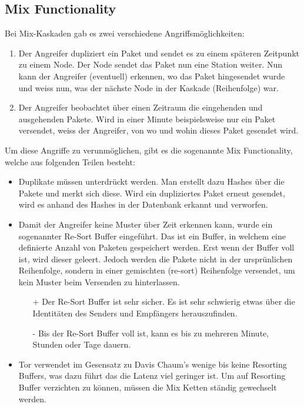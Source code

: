 \subsection{Mix Functionality}\label{sec:mix-functionality}
Bei Mix-Kaskaden gab es zwei verschiedene Angriffsmöglichkeiten:
\begin{enumerate}
    \item Der Angreifer dupliziert ein Paket und sendet es zu einem späteren Zeitpunkt zu einem Node. Der Node sendet das Paket nun eine Station weiter. Nun kann der Angreifer (eventuell) erkennen, wo das Paket hingesendet wurde und weiss nun, was der nächste Node in der Kaskade (Reihenfolge) war.
    \item Der Angreifer beobachtet über einen Zeitraum die eingehenden und ausgehenden Pakete. Wird in einer Minute beispielsweise nur ein Paket versendet, weiss der Angreifer, von wo und wohin dieses Paket gesendet wird.
\end{enumerate}
Um diese Angriffe zu verunmöglichen, gibt es die sogenannte Mix Functionality, welche aus folgenden Teilen besteht:
\begin{itemize}	
	\item Duplikate müssen unterdrückt werden. Man erstellt dazu Hashes über die Pakete und merkt sich diese. Wird ein dupliziertes Paket erneut gesendet, wird es anhand des Hashes in der Datenbank erkannt und verworfen.
	\item Damit der Angreifer keine Muster über Zeit erkennen kann, wurde ein sogenannter Re-Sort Buffer eingeführt. Das ist ein Buffer, in welchem eine definierte Anzahl von Paketen gespeichert werden. Erst wenn der Buffer voll ist, wird dieser geleert. Jedoch werden die Pakete nicht in der ursprünlichen Reihenfolge, sondern in einer gemischten (re-sort) Reihenfolge versendet, um kein Muster beim Versenden zu hinterlassen.
	\begin{itemize}
	    \item[+] Der Re-Sort Buffer ist sehr sicher. Es ist sehr schwierig etwas über die Identitäten des Senders und Empfängers herauszufinden.
	    \item[-] Bis der Re-Sort Buffer voll ist, kann es bis zu mehreren Minute, Stunden oder Tage dauern.
	\end{itemize}
	\item Tor verwendet im Gesensatz zu Davis Chaum's wenige bis keine Resorting Buffers, was dazu führt das die Latenz viel geringer ist. Um auf Resorting Buffer verzichten zu können, müssen die Mix Ketten ständig gewechselt werden. 
\end{itemize}



